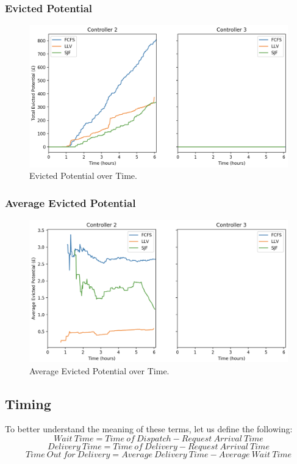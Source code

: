 \documentclass[a4paper,11pt,titlepage]{report}
\begin{document}
\subsubsection{Evicted Potential}
\begin{figure}[!hbpt]
  \center
  \includegraphics[width=\linewidth]{img/small/potential.png}
  \caption{Evicted Potential over Time.}
  \label{fig:small_potential}
\end{figure}

\subsubsection{Average Evicted Potential}
\begin{figure}[!hbpt]
  \center
  \includegraphics[width=\linewidth]{img/small/avgpotential.png}
  \caption{Average Evicted Potential over Time.}
  \label{fig:small_avgpotential}
\end{figure}

\clearpage
\subsection{Timing}
To better understand the meaning of these terms, let us define the following:
$$ Wait\ Time = Time\ of\ Dispatch - Request\ Arrival\ Time $$
$$ Delivery\ Time = Time\ of\ Delivery - Request\ Arrival\ Time $$
$$ Time\ Out\ for\ Delivery = Average\ Delivery\ Time - Average\ Wait\ Time $$
\end{document}
